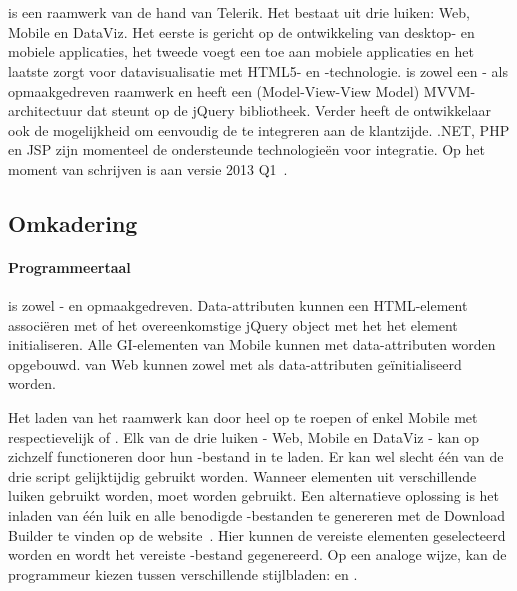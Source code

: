 \section{\kendo}
\label{sec:raamwerk-kendo}
\kendo{} is een raamwerk van de hand van Telerik.
Het bestaat uit drie luiken:  Web, Mobile en DataViz.  
Het eerste is gericht op de ontwikkeling van desktop- en mobiele applicaties,  het tweede voegt een  toe aan mobiele applicaties en het laatste zorgt voor datavisualisatie met HTML5- en \js{}-technologie.
\kendo{} is zowel een \js{}- als opmaakgedreven raamwerk en heeft een (Model-View-View Model) MVVM-architectuur dat steunt op de jQuery bibliotheek.
Verder heeft de ontwikkelaar ook de mogelijkheid om eenvoudig de  te integreren aan de klantzijde.
.NET,  PHP en JSP zijn momenteel de ondersteunde technologieën voor  integratie.
Op het moment van schrijven is \kendo{} aan versie 2013 Q1~\cite{Telerik}. 

\subsection{Omkadering}
\label{sec:kendo-omkadering}

\paragraph{Programmeertaal}
\kendo{} is zowel \js{}- en opmaakgedreven. 
Data-attributen kunnen een HTML-element associëren met \kendo{} of het overeenkomstige jQuery object met \js{} het het element initialiseren.
Alle GI-elementen van \kendo{} Mobile kunnen met data-attributen worden opgebouwd.
 van \kendo{} Web kunnen zowel met \js{} als data-attributen geïnitialiseerd worden.

Het laden van het raamwerk kan door heel \kendo{} op te roepen of enkel \kendo{} Mobile met respectievelijk  of .
Elk van de drie luiken - Web, Mobile en DataViz - kan op zichzelf functioneren door hun \js{}-bestand in te laden.
Er kan wel slecht één van de drie script gelijktijdig gebruikt worden.  
Wanneer elementen uit verschillende luiken gebruikt worden, moet  worden gebruikt.
Een alternatieve oplossing is het inladen van één luik en alle benodigde \js{}-bestanden te genereren met de \js{} Download Builder te vinden op de \kendo{} website~\cite{Telerike}.
Hier kunnen de vereiste elementen geselecteerd worden en wordt het vereiste \js{}-bestand gegenereerd.
Op een analoge wijze, kan de programmeur kiezen tussen verschillende stijlbladen:   en .

